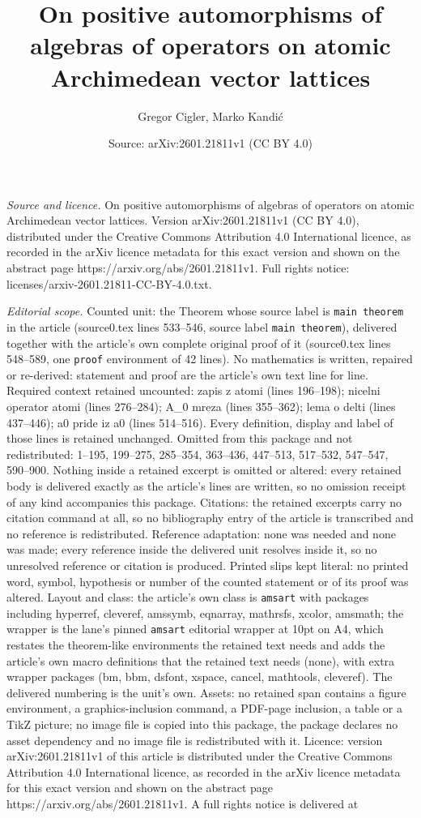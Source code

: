 \documentclass[10pt,a4paper]{amsart}
\title[On positive automorphisms of algebras of operators on atomic]{On positive automorphisms of algebras of operators on atomic Archimedean vector lattices}
\author{Gregor Cigler, Marko Kandi\'c}
\date{Source: arXiv:2601.21811v1 (CC BY 4.0)}
\begin{document}
\maketitle

\noindent\emph{Source and licence.} On positive automorphisms of algebras of operators on atomic Archimedean vector lattices. Version arXiv:2601.21811v1 (CC BY 4.0), distributed under the Creative Commons Attribution 4.0 International licence, as recorded in the arXiv licence metadata for this exact version and shown on the abstract page https://arxiv.org/abs/2601.21811v1. Full rights notice: licenses/arxiv-2601.21811-CC-BY-4.0.txt.\par\smallskip

\noindent\textit{Editorial scope.} Counted unit: the Theorem whose source label is \texttt{main theorem} in the article (source0.tex lines 533--546, source label \texttt{main theorem}), delivered together with the article's own complete original proof of it (source0.tex lines 548--589, one \texttt{proof} environment of 42 lines). No mathematics is written, repaired or re-derived: statement and proof are the article's own text line for line. Required context retained uncounted: zapis z atomi (lines 196--198); nicelni operator atomi (lines 276--284); A\_0 mreza (lines 355--362); lema o delti (lines 437--446); a0 pride iz a0 (lines 514--516). Every definition, display and label of those lines is retained unchanged. Omitted from this package and not redistributed: 1--195, 199--275, 285--354, 363--436, 447--513, 517--532, 547--547, 590--900. Nothing inside a retained excerpt is omitted or altered: every retained body is delivered exactly as the article's lines are written, so no omission receipt of any kind accompanies this package. Citations: the retained excerpts carry no citation command at all, so no bibliography entry of the article is transcribed and no reference is redistributed. Reference adaptation: none was needed and none was made; every reference inside the delivered unit resolves inside it, so no unresolved reference or citation is produced. Printed slips kept literal: no printed word, symbol, hypothesis or number of the counted statement or of its proof was altered. Layout and class: the article's own class is \texttt{amsart} with packages including hyperref, cleveref, amssymb, eqnarray, mathrsfs, xcolor, amsmath; the wrapper is the lane's pinned \texttt{amsart} editorial wrapper at 10pt on A4, which restates the theorem-like environments the retained text needs and adds the article's own macro definitions that the retained text needs (none), with extra wrapper packages (bm, bbm, dsfont, xspace, cancel, mathtools, cleveref). The delivered numbering is the unit's own. Assets: no retained span contains a figure environment, a graphics-inclusion command, a PDF-page inclusion, a table or a TikZ picture; no image file is copied into this package, the package declares no asset dependency and no image file is redistributed with it. Licence: version arXiv:2601.21811v1 of this article is distributed under the Creative Commons Attribution 4.0 International licence, as recorded in the arXiv licence metadata for this exact version and shown on the abstract page https://arxiv.org/abs/2601.21811v1. A full rights notice is delivered at 
\end{document}
